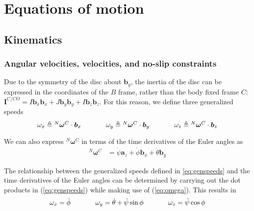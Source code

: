 \documentclass[letterpaper,11pt]{article}
\newcommand{\bs}[1]{\boldsymbol{#1}}
\begin{document}


\section{Equations of motion}

\subsection{Kinematics}

\subsubsection{Angular velocities, velocities, and no-slip constraints}

Due to the symmetry of the disc about $\bs{b}_y$, the inertia of the disc can
be expressed in the coordinates of the $B$ frame, rather than the
body fixed frame $C$:  $\bs{I}^{C/CO} = I \bs{b}_x\bs{b}_x + J \bs{b}_y\bs{b}_y
+ I \bs{b}_z\bs{b}_z$.  For this reason, we define three generalized speeds
\begin{equation}
  \begin{tabular}{ccccccc}
    $\omega_x \triangleq {}^{N}\bs{\omega}^C \cdot \bs{b}_x$ & & &
    $\omega_y \triangleq {}^{N}\bs{\omega}^C \cdot \bs{b}_y$ & & &
    $\omega_z \triangleq {}^{N}\bs{\omega}^C \cdot \bs{b}_z$
  \end{tabular}
  \label{eq:genspeeds}
\end{equation}

We can also express ${}^N\bs{\omega}^C$ in terms of the time derivatives of the Euler angles as
\begin{align}
  {}^N\bs{\omega}^C & = \dot{\psi} \bs{a}_z + \dot{\phi} \bs{b}_x +
  \dot{\theta} \bs{b}_y
  \label{eq:omega}
\end{align}

The relationship between the generalized speeds defined in \ref{eq:genspeeds}
and the time derivatives of the Euler angles can be determined by carrying out
the dot products in
(\ref{eq:genspeeds}) while making use of (\ref{eq:omega}).  This results in
\begin{equation}
  \begin{tabular}{ccccccc}
    $\omega_x = \dot{\phi}$ & & &
    $\omega_y = \dot{\theta} + \dot{\psi}\sin{\phi}$ & & &
    $\omega_z = \dot{\psi} \cos{\phi}$
  \end{tabular}
  \label{eq:kindiffs1}
\end{equation}
\end{document}
